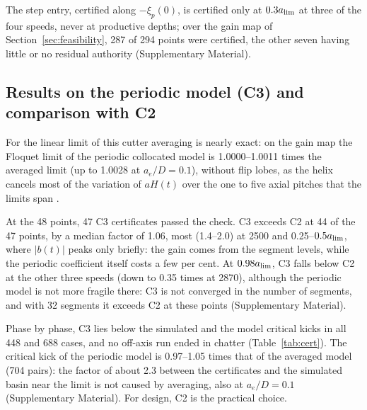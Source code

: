 The step entry, certified along $-\xi_p(0)$, is certified only at $0.3a_{\lim}$ at three of the four speeds, never at productive depths; over the gain map of Section~\ref{sec:feasibility}, 287 of 294 points were certified, the other seven having little or no residual authority (Supplementary Material).

\subsection{Results on the periodic model (C3) and comparison with C2}\label{sec:cert-c3}

For the linear limit of this cutter averaging is nearly exact: on the gain map the Floquet limit of the periodic collocated model is 1.0000--1.0011 times the averaged limit (up to 1.0028 at $a_e/D=0.1$), without flip lobes, as the helix cancels most of the variation of $aH(t)$ over the one to five axial pitches that the limits span \citep{insperger2006helix,zatarain2006helix}.

At the 48 points, 47 C3 certificates passed the check. C3 exceeds C2 at 44 of the 47 points, by a median factor of 1.06, most (1.4--2.0) at \SI{2500}{\rpm} and 0.25--$0.5a_{\lim}$, where $\lvert b(t)\rvert$ peaks only briefly: the gain comes from the segment levels, while the periodic coefficient itself costs a few per cent. At $0.98a_{\lim}$, C3 falls below C2 at the other three speeds (down to 0.35 times at \SI{2870}{\rpm}), although the periodic model is not more fragile there: C3 is not converged in the number of segments, and with 32 segments it exceeds C2 at these points (Supplementary Material).

Phase by phase, C3 lies below the simulated and the model critical kicks in all 448 and 688 cases, and no off-axis run ended in chatter (Table~\ref{tab:cert}). The critical kick of the periodic model is 0.97--1.05 times that of the averaged model (704 pairs): the factor of about 2.3 between the certificates and the simulated basin near the limit is not caused by averaging, also at $a_e/D=0.1$ (Supplementary Material). For design, C2 is the practical choice.

